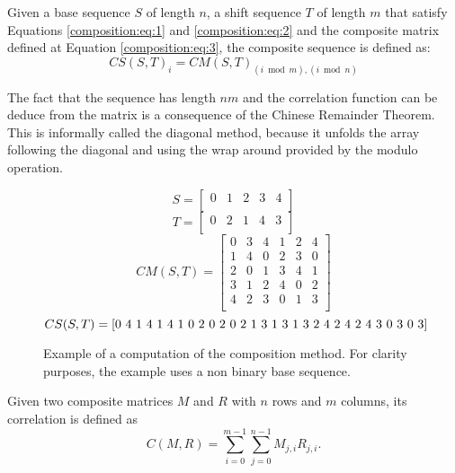 \begin{definition}
  Given a base sequence $S$ of length $n$, a shift sequence $T$ of
  length $m$ that satisfy Equations \eqref{composition:eq:1} and
  \eqref{composition:eq:2} and the composite matrix defined at Equation
  \eqref{composition:eq:3}, the composite sequence is defined as:
  \begin{equation}
    CS(S, T)_{i} = CM(S, T)_{(i \bmod m), (i \bmod n)}
  \end{equation}
\end{definition}
The fact that the sequence has length $nm$ and the correlation function can be deduce from the matrix is a consequence of the Chinese Remainder Theorem.  This is informally called the diagonal method, because it unfolds the array following the diagonal and using the wrap around provided by the modulo operation.
\begin{figure}[ht!]
  $$S = \begin{bmatrix}
    0 & 1 & 2 & 3 & 4\\
  \end{bmatrix}$$
  $$T = \begin{bmatrix}
    0 & 2 & 1 & 4 & 3 \\
  \end{bmatrix}
  $$
  $$CM(S, T) = \begin{bmatrix}
  0 & 3 & 4 & 1 & 2 & 4\\
  1 & 4 & 0 & 2 & 3 & 0\\
  2 & 0 & 1 & 3 & 4 & 1\\
  3 & 1 & 2 & 4 & 0 & 2\\
  4 & 2 & 3 & 0 & 1 & 3\\
  \end{bmatrix}
  $$
  $$CS(S, T) = \text{[0 4 1 4 1 4 1 0 2 0 2 0 2 1 3 1 3 1 3 2 4 2 4 2 4 3 0 3 0 3]}\\
  $$
  \caption{Example of a computation of the composition method. For clarity purposes, the example uses a non binary base sequence.}
  \label{}
\end{figure}

\begin{definition}
  Given two composite matrices $M$ and $R$ with $n$ rows and $m$ columns,
  its correlation is defined as
  \begin{equation}
    C(M, R) = \sum_{i=0}^{m-1}\sum_{j=0}^{n-1}M_{j, i}R_{j,i}.
  \end{equation}
\end{definition}

